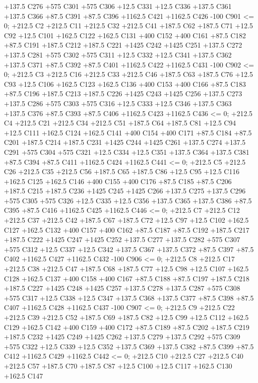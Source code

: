  +137.5 C276 +575 C301 +575 C306 +12.5 C331 +12.5 C336 +137.5 C361 +137.5 C366 +87.5 C391 +87.5 C396
 +1162.5 C421 +1162.5 C426 -100 C901 <= 0;
+212.5 C2 +212.5 C11 +212.5 C32 +212.5 C41 +187.5 C62 +187.5 C71 +12.5 C92 +12.5 C101 +162.5 C122 +162.5 C131
 +400 C152 +400 C161 +87.5 C182 +87.5 C191 +187.5 C212 +187.5 C221 +1425 C242 +1425 C251 +137.5 C272
 +137.5 C281 +575 C302 +575 C311 +12.5 C332 +12.5 C341 +137.5 C362 +137.5 C371 +87.5 C392 +87.5 C401
 +1162.5 C422 +1162.5 C431 -100 C902 <= 0;
+212.5 C3 +212.5 C16 +212.5 C33 +212.5 C46 +187.5 C63 +187.5 C76 +12.5 C93 +12.5 C106 +162.5 C123 +162.5 C136
 +400 C153 +400 C166 +87.5 C183 +87.5 C196 +187.5 C213 +187.5 C226 +1425 C243 +1425 C256 +137.5 C273
 +137.5 C286 +575 C303 +575 C316 +12.5 C333 +12.5 C346 +137.5 C363 +137.5 C376 +87.5 C393 +87.5 C406
 +1162.5 C423 +1162.5 C436 <= 0;
+212.5 C4 +212.5 C21 +212.5 C34 +212.5 C51 +187.5 C64 +187.5 C81 +12.5 C94 +12.5 C111 +162.5 C124 +162.5 C141
 +400 C154 +400 C171 +87.5 C184 +87.5 C201 +187.5 C214 +187.5 C231 +1425 C244 +1425 C261 +137.5 C274
 +137.5 C291 +575 C304 +575 C321 +12.5 C334 +12.5 C351 +137.5 C364 +137.5 C381 +87.5 C394 +87.5 C411
 +1162.5 C424 +1162.5 C441 <= 0;
+212.5 C5 +212.5 C26 +212.5 C35 +212.5 C56 +187.5 C65 +187.5 C86 +12.5 C95 +12.5 C116 +162.5 C125 +162.5 C146
 +400 C155 +400 C176 +87.5 C185 +87.5 C206 +187.5 C215 +187.5 C236 +1425 C245 +1425 C266 +137.5 C275
 +137.5 C296 +575 C305 +575 C326 +12.5 C335 +12.5 C356 +137.5 C365 +137.5 C386 +87.5 C395 +87.5 C416
 +1162.5 C425 +1162.5 C446 <= 0;
+212.5 C7 +212.5 C12 +212.5 C37 +212.5 C42 +187.5 C67 +187.5 C72 +12.5 C97 +12.5 C102 +162.5 C127 +162.5 C132
 +400 C157 +400 C162 +87.5 C187 +87.5 C192 +187.5 C217 +187.5 C222 +1425 C247 +1425 C252 +137.5 C277
 +137.5 C282 +575 C307 +575 C312 +12.5 C337 +12.5 C342 +137.5 C367 +137.5 C372 +87.5 C397 +87.5 C402
 +1162.5 C427 +1162.5 C432 -100 C906 <= 0;
+212.5 C8 +212.5 C17 +212.5 C38 +212.5 C47 +187.5 C68 +187.5 C77 +12.5 C98 +12.5 C107 +162.5 C128 +162.5 C137
 +400 C158 +400 C167 +87.5 C188 +87.5 C197 +187.5 C218 +187.5 C227 +1425 C248 +1425 C257 +137.5 C278
 +137.5 C287 +575 C308 +575 C317 +12.5 C338 +12.5 C347 +137.5 C368 +137.5 C377 +87.5 C398 +87.5 C407
 +1162.5 C428 +1162.5 C437 -100 C907 <= 0;
+212.5 C9 +212.5 C22 +212.5 C39 +212.5 C52 +187.5 C69 +187.5 C82 +12.5 C99 +12.5 C112 +162.5 C129 +162.5 C142
 +400 C159 +400 C172 +87.5 C189 +87.5 C202 +187.5 C219 +187.5 C232 +1425 C249 +1425 C262 +137.5 C279
 +137.5 C292 +575 C309 +575 C322 +12.5 C339 +12.5 C352 +137.5 C369 +137.5 C382 +87.5 C399 +87.5 C412
 +1162.5 C429 +1162.5 C442 <= 0;
+212.5 C10 +212.5 C27 +212.5 C40 +212.5 C57 +187.5 C70 +187.5 C87 +12.5 C100 +12.5 C117 +162.5 C130 +162.5 C147
